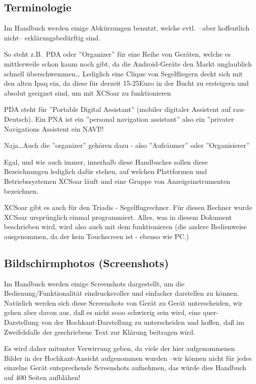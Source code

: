 \subsection*{Terminologie}
Im Handbuch werden einige Abkürzungen benutzt, welche evtl.\ --aber hoffentlich nicht--  erklärungsbedürftig sind.

So  steht z.B.\  PDA oder ''Organizer'' für eine Reihe von Geräten, welche es mittlerweile schon kaum noch 
gibt, da die Android-Geräte den Markt unglaublich schnell überschwemmen\dots  
{\small Lediglich eine Clique von Segelfliegern deckt sich mit den alten Ipaq ein, da diese für derzeit 15-25Euro in der Bucht 
zu ersteigern und absolut geeignet sind, um mit \textsf{XCSoar} zu funktionieren}

PDA steht für ''Portable Digital Assistant'' (mobiler digitaler Assistent auf rau-Deutsch). 
Ein PNA ist ein ''personal navigation assistant'' also ein ''privater Navigations Assistent ein NAVI!!

Naja\dots Auch die ''organizer'' gehören dazu - also ''Aufräumer'' oder ''Organisierer'' 
 
Egal, und wie auch immer, innerhalb diese Handbuches sollen diese Bezeichnungen lediglich dafür stehen, 
auf welchen Plattformen und Betriebssystemen \textsf{XCSoar} läuft und eine Gruppe von Anzeigeinstrumenten bezeichnen. 

\textsf{XCSoar} gibt es auch für den Triadis \al - Segelflugrechner. 
Für diesen Rechner wurde \textsf{XCSoar} ursprünglich einmal programmiert. Alles, was in diesem Dokument beschrieben wird, wird also auch 
mit dem \al funktionieren (die andere Bedienweise ausgenommen, da der \al kein Touchscreen ist - ebenso wie PC.)

\subsection*{Bildschirmphotos (Screenshots)}

Im Handbuch werden einige Screenshots dargestellt, um die Bedienung/Funktionalität eindrucksvoller und einfacher darstellen zu können.
Natürlich werden sich diese Screenshots von Gerät zu Gerät unterscheiden, wir gehen aber davon aus, daß es nicht sooo 
schwierig sein wird, eine quer-Darstellung  von der Hochkant-Darstellung zu unterscheiden und hoffen, daß im Zweifelsfalle der geschriebene
Text zur Klärung  beitragen wird. 

Es wird daher mitunter Verwirrung geben, da viele der hier aufgenommenen Bilder in der Hochkant-Ansicht aufgenommen wurden 
--wir können nicht für jedes einzelne Gerät entsprechende Screenshots aufnehmen, das würde dies Handbuch auf 400 Seiten aufblähen! 

